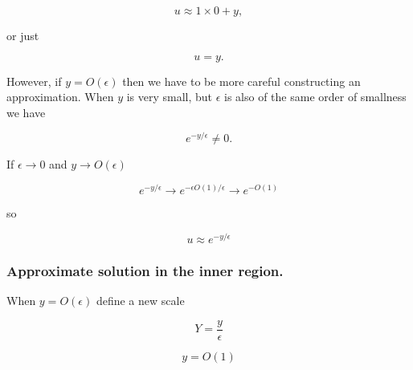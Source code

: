 \begin{equation}\label{eqn:continuumL20:n}
u \approx 1 \times 0 + y,
\end{equation}

or just

\begin{equation}\label{eqn:continuumL20:n}
u = y.
\end{equation}

However, if $y = O(\epsilon)$ then we have to be more careful constructing an approximation.  When $y$ is very small, but $\epsilon$ is also of the same order of smallness we have

%
%
%
%
%
\begin{equation}\label{eqn:continuumL20:130}
e^{-y/\epsilon} \ne 0.
\end{equation}

If $\epsilon \rightarrow 0$ and $y \rightarrow O(\epsilon)$

\begin{equation}\label{eqn:continuumL20:150}
e^{-y/\epsilon} \rightarrow e^{-\epsilon O(1) /\epsilon} \rightarrow e^{-O(1)}
\end{equation}

so 

\begin{equation}\label{eqn:continuumL20:170}
u \approx e^{-y/\epsilon}
\end{equation}


\subsubsection{Approximate solution in the inner region.}

When $y = O(\epsilon)$ define a new scale

\begin{equation}\label{eqn:continuumL20:190}
Y = \frac{y}{\epsilon}
\end{equation}

\begin{equation}\label{eqn:continuumL20:210}
y = O(1)
\end{equation}

